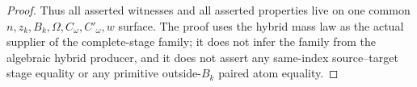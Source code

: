 \begin{proof}
Thus all asserted witnesses and all asserted properties live on one common
\(n,z_k,B_k,\Omega,C_\omega,C'_\omega,w\) surface.  The proof uses the
hybrid mass law as the actual supplier of the complete-stage family; it does
not infer the family from the algebraic hybrid producer, and it does not
assert any same-index source--target stage equality or any primitive
outside-\(B_k\) paired atom equality.
\end{proof}
